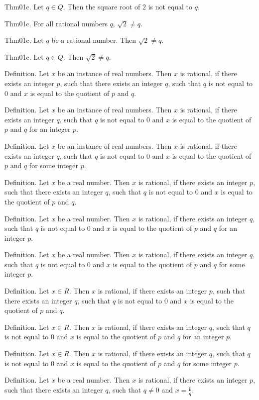 \documentclass{article}
\begin{document}
Thm01c. Let $q \in Q$. Then the square root of $2$ is not equal to $q$.

Thm01c. For all rational numbers $q$, $\sqrt{ 2}\neq q$.

Thm01c. Let $q$ be a rational number. Then $\sqrt{ 2}\neq q$.

Thm01c. Let $q \in Q$. Then $\sqrt{ 2}\neq q$.

Definition. Let $x$ be an instance of real numbers. Then $x$ is rational, if there exists an integer $p$, such that there exists an integer $q$, such that $q$ is not equal to $0$ and $x$ is equal to the quotient of $p$ and $q$.

Definition. Let $x$ be an instance of real numbers. Then $x$ is rational, if there exists an integer $q$, such that $q$ is not equal to $0$ and $x$ is equal to the quotient of $p$ and $q$ for an integer $p$.

Definition. Let $x$ be an instance of real numbers. Then $x$ is rational, if there exists an integer $q$, such that $q$ is not equal to $0$ and $x$ is equal to the quotient of $p$ and $q$ for some integer $p$.

Definition. Let $x$ be a real number. Then $x$ is rational, if there exists an integer $p$, such that there exists an integer $q$, such that $q$ is not equal to $0$ and $x$ is equal to the quotient of $p$ and $q$.

Definition. Let $x$ be a real number. Then $x$ is rational, if there exists an integer $q$, such that $q$ is not equal to $0$ and $x$ is equal to the quotient of $p$ and $q$ for an integer $p$.

Definition. Let $x$ be a real number. Then $x$ is rational, if there exists an integer $q$, such that $q$ is not equal to $0$ and $x$ is equal to the quotient of $p$ and $q$ for some integer $p$.

Definition. Let $x \in R$. Then $x$ is rational, if there exists an integer $p$, such that there exists an integer $q$, such that $q$ is not equal to $0$ and $x$ is equal to the quotient of $p$ and $q$.

Definition. Let $x \in R$. Then $x$ is rational, if there exists an integer $q$, such that $q$ is not equal to $0$ and $x$ is equal to the quotient of $p$ and $q$ for an integer $p$.

Definition. Let $x \in R$. Then $x$ is rational, if there exists an integer $q$, such that $q$ is not equal to $0$ and $x$ is equal to the quotient of $p$ and $q$ for some integer $p$.

Definition. Let $x$ be a real number. Then $x$ is rational, if there exists an integer $p$, such that there exists an integer $q$, such that $q \neq 0$ and $x = \frac{ p}{q}$.
\end{document}
